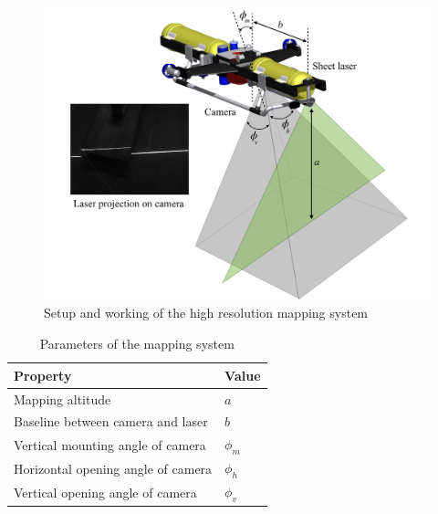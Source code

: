 \begin{figure}[!ht]
\centering\includegraphics[width=7in]{./images/mehul3.png}
\caption{Setup and working of the high resolution mapping system}
\label{f:mehul3}
\end{figure}

\begin{table}[!ht]
\centering
\caption{Parameters of the mapping system}
\begin{tabular}{  |p{6cm}  p{4cm}| }
\hline
\textbf{Property} & \textbf{Value}\\ \hline 
Mapping altitude & $a$\\
Baseline between camera and laser & $b$\\
Vertical mounting angle of camera & $\phi_m$\\
Horizontal opening angle of camera & $\phi_h$\\
Vertical opening angle of camera & $\phi_v$\\
\hline
\end{tabular}
\label{t:table0}
\end{table}

 